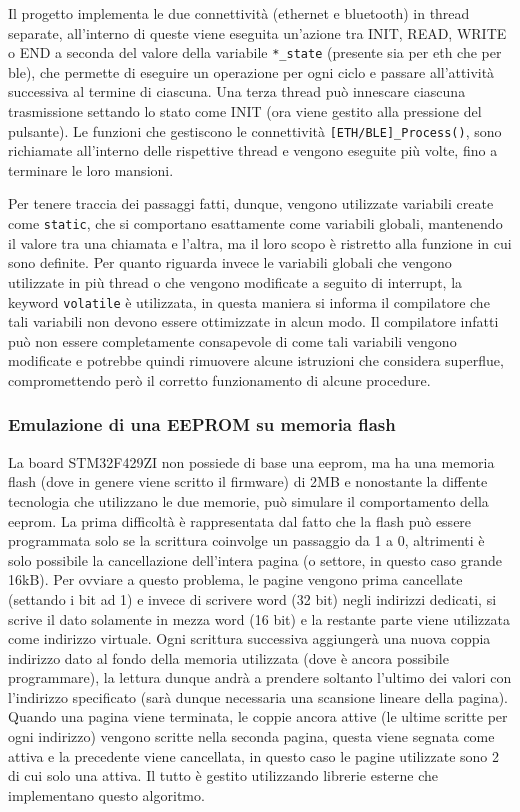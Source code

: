 Il progetto implementa le due connettivit\`a (ethernet e bluetooth) in thread separate, all'interno di queste viene eseguita un'azione tra INIT, READ, WRITE o END a seconda del valore della variabile \texttt{*\_state} (presente sia per eth che per ble), che permette di eseguire un operazione per ogni ciclo e passare all'attivit\`a successiva al termine di ciascuna. Una terza thread pu\`o innescare ciascuna trasmissione settando lo stato come INIT (ora viene gestito alla pressione del pulsante). Le funzioni che gestiscono le connettivit\`a \texttt{[ETH/BLE]\_Process()}, sono richiamate all'interno delle rispettive thread e vengono eseguite pi\`u volte, fino a terminare le loro mansioni.

Per tenere traccia dei passaggi fatti, dunque, vengono utilizzate variabili create come \texttt{static}, che si comportano esattamente come variabili globali, mantenendo il valore tra una chiamata e l'altra, ma il loro scopo \`e ristretto alla funzione in cui sono definite. Per quanto riguarda invece le variabili globali che vengono utilizzate in pi\`u thread o che vengono modificate a seguito di interrupt, la keyword \texttt{volatile} \`e utilizzata, in questa maniera si informa il compilatore che tali variabili non devono essere ottimizzate in alcun modo. Il compilatore infatti pu\`o non essere completamente consapevole di come tali variabili vengono modificate e potrebbe quindi rimuovere alcune istruzioni che considera superflue, compromettendo per\`o il corretto funzionamento di alcune procedure.

\subsubsection{Emulazione di una EEPROM su memoria flash}

La board STM32F429ZI non possiede di base una eeprom, ma ha una memoria flash (dove in genere viene scritto il firmware) di 2MB e nonostante la diffente tecnologia che utilizzano le due memorie, pu\`o simulare il comportamento della eeprom. La prima difficolt\`a \`e rappresentata dal fatto che la flash pu\`o essere programmata solo se la scrittura coinvolge un passaggio da 1 a 0, altrimenti \`e solo possibile la cancellazione dell'intera pagina (o settore, in questo caso grande 16kB). Per ovviare a questo problema, le pagine vengono prima cancellate (settando i bit ad 1) e invece di scrivere word (32 bit) negli indirizzi dedicati, si scrive il dato solamente in mezza word (16 bit) e la restante parte viene utilizzata come indirizzo virtuale. Ogni scrittura successiva aggiunger\`a una nuova coppia indirizzo dato al fondo della memoria utilizzata (dove \`e ancora possibile programmare), la lettura dunque andr\`a a prendere soltanto l'ultimo dei valori con l'indirizzo specificato (sar\`a dunque necessaria una scansione lineare della pagina). Quando una pagina viene terminata, le coppie ancora attive (le ultime scritte per ogni indirizzo) vengono scritte nella seconda pagina, questa viene segnata come attiva e la precedente viene cancellata, in questo caso le pagine utilizzate sono 2 di cui solo una attiva. Il tutto \`e gestito utilizzando librerie esterne che implementano questo algoritmo.

